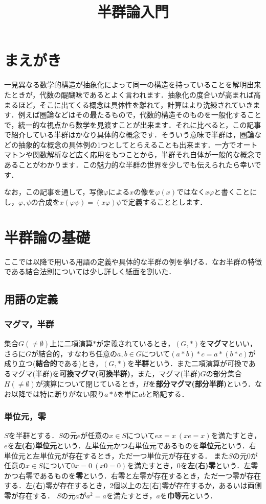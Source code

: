\documentclass{jsarticle}
\title{半群論入門}
\begin{document}
\maketitle
\section*{まえがき}
一見異なる数学的構造が抽象化によって同一の構造を持っていることを解明出来たときが，代数の醍醐味であるとよく言われます．抽象化の度合いが高まれば高まるほど，そこに出てくる概念は具体性を離れて，計算はより洗練されていきます．例えば圏論などはその最たるもので，代数的構造そのものを一般化することで，統一的な視点から数学を見渡すことが出来ます．それに比べると，この記事で紹介している半群はかなり具体的な概念です．そういう意味で半群は，圏論などの抽象的な概念の具体例の1つとしてとらえることも出来ます．一方でオートマトンや関数解析など広く応用をもつことから，半群それ自体が一般的な概念であることがわかります．この魅力的な半群の世界を少しでも伝えられたら幸いです．\par
なお，この記事を通して，写像$\varphi$による$x$の像を$\varphi(x)$ではなく$x\varphi$と書くことにし，$\varphi,\psi$の合成を$x(\varphi\psi)=(x\varphi)\psi$で定義することとします．
\section{半群論の基礎}
ここでは以降で用いる用語の定義や具体的な半群の例を挙げる．なお半群の特徴である結合法則については少し詳しく紙面を割いた．
\subsection{用語の定義}
\subsubsection{マグマ，半群}
 集合$G(\neq\emptyset)$上に二項演算$*$が定義されているとき，$(G,*)$を{\bf マグマ}といい，さらに$G$が結合的，すなわち任意の$a,b\in G$について$(a*b)*c=a*(b*c)$が成り立つ({\bf 結合的}である)とき，$(G,*)$を{\bf 半群}という．また二項演算が可換であるマグマ(半群)を{\bf 可換マグマ(可換半群)}，また，マグマ(半群)$G$の部分集合$H(\neq\emptyset)$が演算について閉じているとき，$H$を{\bf 部分マグマ(部分半群)}という．なお以降では特に断りがない限り$a*b$を単に$ab$と略記する．
\subsubsection{単位元，零}
$S$を半群とする．$S$の元$e$が任意の$x\in S$について$ex=x\:(xe=x)$を満たすとき，$e$を{\bf 左(右)単位元}という．左単位元かつ右単位元であるものを{\bf 単位元}という．右単位元と左単位元が存在するとき，ただ一つ単位元が存在する．
\newline
 また$S$の元$0$が任意の$x\in S$について$0x=0\:(x0=0)$を満たすとき，$0$を{\bf 左(右)零}という．左零かつ右零であるものを{\bf 零}という．右零と左零が存在するとき，ただ一つ零が存在する．左(右)零が存在するとき，2個以上の左(右)零が存在するか，あるいは両側零が存在する．
\newline
 $S$の元$a$が$a^2=a$を満たすとき，$a$を{\bf 巾等元}という．
\end{document}
